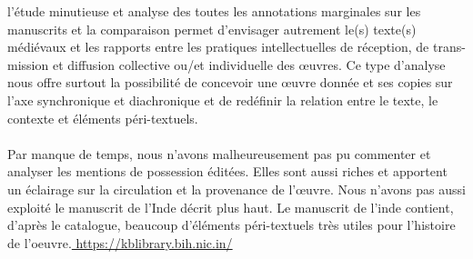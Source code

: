 \documentclass[a4paper,12pt]{report}
\begin{document}
 l'étude minutieuse et analyse des toutes les annotations marginales sur les manuscrits et la comparaison permet  d'envisager autrement le(s) texte(s) médiévaux et les rapports entre les pratiques intellectuelles de réception, de trans-mission et diffusion collective ou/et individuelle  des œuvres. Ce type d'analyse nous offre surtout la possibilité de concevoir  une œuvre donnée et ses  copies sur l'axe synchronique et diachronique et de redéfinir la  relation entre le texte, le contexte et éléments péri-textuels.           \paragraph{}                                                  
  Par manque de temps, nous n'avons malheureusement pas pu commenter et analyser les mentions de possession éditées. Elles sont aussi riches et apportent un éclairage sur la circulation et la provenance de l'œuvre. Nous n'avons pas aussi exploité le manuscrit de l'Inde décrit plus haut.  Le manuscrit de l'inde contient, d'après le catalogue, beaucoup d'éléments péri-textuels très utiles pour l'histoire de l'oeuvre.\url{ https://kblibrary.bih.nic.in/}                                     
\end{document}
